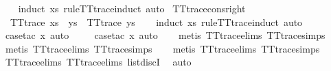 %
\isadelimproof
\ \ %
\endisadelimproof
%
\isatagproof
{}\isamarkupfalse%
\ {\isacharparenleft}induct\ xs\ rule{\isacharcolon}TT{}{\isacharunderscore}trace{\isachardot}induct{\isacharcomma}\ auto{\isacharparenright}%
\endisatagproof
{\isafoldproof}%
%
\isadelimproof
\isanewline
%
\endisadelimproof
\isanewline
{}\isamarkupfalse%
\ TT{}{\isacharunderscore}trace{\isacharunderscore}cons{\isacharunderscore}right{\isacharcolon}\isanewline
\ \ {\isachardoublequoteopen}TT{}{\isacharunderscore}trace\ {\isacharparenleft}xs\ {\isacharat}\ ys{\isacharparenright}\ {\isasymLongrightarrow}\ TT{}{\isacharunderscore}trace\ ys{\isachardoublequoteclose}\isanewline
%
\isadelimproof
\ \ %
\endisadelimproof
%
\isatagproof
{}\isamarkupfalse%
\ {\isacharparenleft}induct\ xs\ rule{\isacharcolon}TT{}{\isacharunderscore}trace{\isachardot}induct{\isacharcomma}\ auto{\isacharparenright}\isanewline
\ \ \isamarkupfalse%
\ {\isacharparenleft}case{\isacharunderscore}tac\ x{\isacharcomma}\ auto{\isacharparenright}\isanewline
\ \ \ \isamarkupfalse%
\ {\isacharparenleft}case{\isacharunderscore}tac\ x{}{\isacharcomma}\ auto{\isacharparenright}\isanewline
\ \ \isamarkupfalse%
\ {\isacharparenleft}metis\ TT{}{\isacharunderscore}trace{\isachardot}elims{\isacharparenleft}{}{\isacharparenright}\ TT{}{\isacharunderscore}trace{\isachardot}simps{\isacharparenleft}{}{\isacharparenright}{\isacharparenright}\isanewline
\ \ \isamarkupfalse%
\ {\isacharparenleft}metis\ TT{}{\isacharunderscore}trace{\isachardot}elims{\isacharparenleft}{}{\isacharparenright}\ TT{}{\isacharunderscore}trace{\isachardot}simps{\isacharparenleft}{}{\isacharparenright}{\isacharparenright}\isanewline
\ \ \isamarkupfalse%
\ {\isacharparenleft}metis\ TT{}{\isacharunderscore}trace{\isachardot}elims{\isacharparenleft}{}{\isacharparenright}\ TT{}{\isacharunderscore}trace{\isachardot}simps{\isacharparenleft}{}{\isacharparenright}{\isacharparenright}\isanewline
\ \ \isamarkupfalse%
\ TT{}{\isacharunderscore}trace{\isachardot}elims{\isacharparenleft}{}{\isacharparenright}\ TT{}{\isacharunderscore}trace{\isachardot}elims{\isacharparenleft}{}{\isacharparenright}\ list{\isachardot}discI\ \isamarkupfalse%
\ auto%
\endisatagproof
